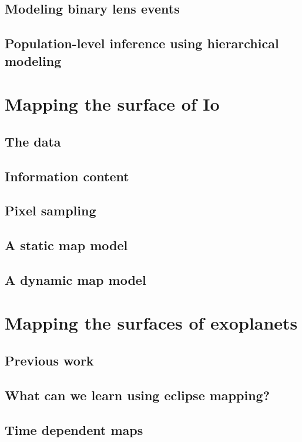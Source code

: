 \documentclass[11pt]{report}
\begin{document}
\section{Modeling binary lens events}
\section{Population-level inference using hierarchical modeling}

\chapter{Mapping the surface of Io}
\label{ch:mapping_io}
\section{The data}
\section{Information content}
\section{Pixel sampling}
\section{A static map model}
\section{A dynamic map model}

\chapter{Mapping the surfaces of exoplanets}
\label{ch:mapping_exoplanets}
\section{Previous work}
\section{What can we learn using eclipse mapping?}
\section{Time dependent maps}
\end{document}
